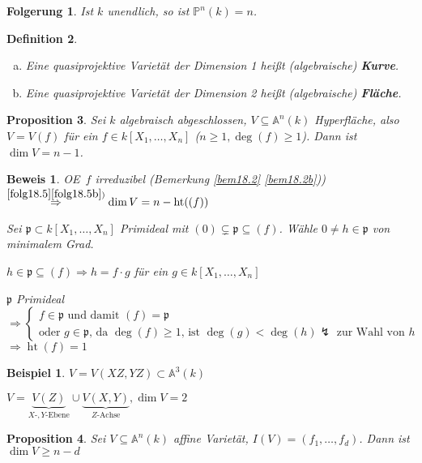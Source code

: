 \documentclass[a4paper, 12pt, numbers=noendperiod, chapterprefix=true, headsepline]{scrbook}
\theoremstyle{break}
\newtheorem{Def}{Definition}[section]
\newtheorem{Prop}[Def]{Proposition}
\newtheorem{Folg}[Def]{Folgerung}
\theoremstyle{nonumberbreak}
\newtheorem{nnBsp}{Beispiel}
\newtheorem{Bew}{Beweis}
\theoremstyle{nonumberplain}
\newcommand{\emp}[1]{\textbf{\emph{#1}}}
\newcommand{\defterm}[1]{{\index{#1}}\emp{#1}}
\DeclareMathOperator{\Ht}{ht}
\newcommand{\A}{\mathbb{A}}
\newcommand{\IP}{\mathbb{P}}%
\renewcommand{\OE}{O\!\!E~}
\begin{document}
\begin{Folg}
Ist $k$ unendlich, so ist $\IP^n(k)=n$.
\end{Folg}

\begin{Def}\begin{enumerate}[a)]
\item
	Eine quasiprojektive Variet\"at der Dimension 1 hei\ss t (algebraische) \defterm{Kurve}.
\item
	Eine quasiprojektive Variet\"at der Dimension 2 hei\ss t (algebraische) \defterm{Fl\"ache}.
\end{enumerate}\end{Def}

\begin{Prop}
Sei $k$ algebraisch abgeschlossen, $V\subseteq\A^n(k)$ Hyperfl\"ache, also $V=V(f)$ f\"ur ein $f\in k[X_1,\ldots ,X_n]$ ($n\ge1, \deg(f)\ge1$). Dann ist $\dim V=n-1$.
\end{Prop}

\begin{Bew}
\OE $f$ irreduzibel (Bemerkung \ref{bem18.2} \ref{bem18.2b})) $\overset{\ref{folg18.5} \ref{folg18.5b})}{\Rightarrow } \dim V=n-\Ht((f))$

Sei $\mathfrak p\subset k[X_1,\ldots ,X_n]$ Primideal mit $(0)\subsetneq \mathfrak p\subseteq(f)$. W\"ahle $0\ne h\in \mathfrak p$ von minimalem Grad.

$h\in \mathfrak p\subseteq(f)\Rightarrow h=f\cdot g$ f\"ur ein $g\in k[X_1,\ldots ,X_n]$

$\mathfrak p$ Primideal $\Rightarrow \left\{\begin{array}{l}
	f\in \mathfrak p \text{ und damit } (f)=\mathfrak p\\
	\text{oder } g\in \mathfrak p \text{, da } \deg(f)\ge1\text{, ist }\deg(g)<\deg(h) \lightning \text{ zur Wahl von }h\end{array}\right.$\\
$\Rightarrow \Ht(f)=1$
\end{Bew}

\begin{nnBsp}
$V=V(XZ,YZ)\subset\A^3(k)$

$V=\underbrace{V(Z)}_{X\text{-},Y\text{-}\text{Ebene}} \cup \underbrace{V(X,Y)}_{Z\text{-}\text{Achse}}, \dim V=2$
\end{nnBsp}

\begin{Prop}
Sei $V\subseteq\A^n(k)$ affine Variet\"at, $I(V)=(f_1,\ldots ,f_d)$. Dann ist $\dim V\ge n-d$
\end{Prop}
\end{document}
